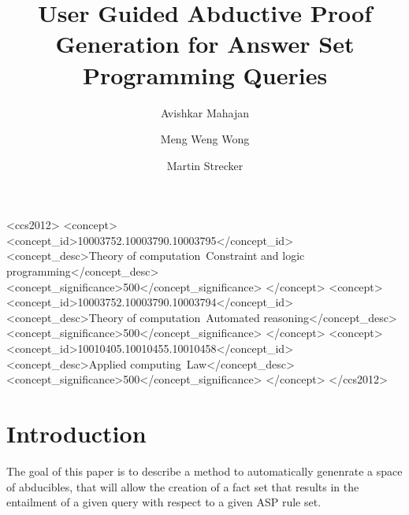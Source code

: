 \documentclass[sigconf]{acmart}
\begin{document}
\title{User Guided Abductive Proof Generation for Answer Set Programming
  Queries}

\author{Avishkar Mahajan}
\author{Meng Weng Wong}

\author{Martin Strecker}



\begin{CCSXML}
<ccs2012>
   <concept>
       <concept_id>10003752.10003790.10003795</concept_id>
       <concept_desc>Theory of computation~Constraint and logic programming</concept_desc>
       <concept_significance>500</concept_significance>
       </concept>
   <concept>
       <concept_id>10003752.10003790.10003794</concept_id>
       <concept_desc>Theory of computation~Automated reasoning</concept_desc>
       <concept_significance>500</concept_significance>
       </concept>
   <concept>
       <concept_id>10010405.10010455.10010458</concept_id>
       <concept_desc>Applied computing~Law</concept_desc>
       <concept_significance>500</concept_significance>
       </concept>
 </ccs2012>
\end{CCSXML}


\maketitle


\section{Introduction}
The goal of this paper is to describe a method to automatically genenrate a space of abducibles, that will allow the creation of a fact set that results in the entailment of a given query with respect to a given ASP rule set.
\end{document}
